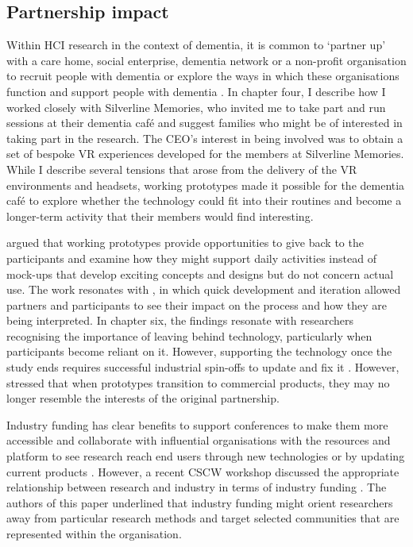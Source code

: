 \subsection{Partnership impact}
Within HCI research in the context of dementia, it is common to `partner up' with a care home, social enterprise, dementia network or a non-profit organisation to recruit people with dementia or explore the ways in which these organisations function and support people with dementia \citep{bartlett2019strategies}. In chapter four, I describe how I worked closely with Silverline Memories, who invited me to take part and run sessions at their dementia café and suggest families who might be of interested in taking part in the research. The CEO's interest in being involved was to obtain a set of bespoke VR experiences developed for the members at Silverline Memories. While I describe several tensions that arose from the delivery of the VR environments and headsets, working prototypes made it possible for the dementia café to explore whether the technology could fit into their routines and become a longer-term activity that their members would find interesting. 

\cite{bodker2018participatory} argued that working prototypes provide opportunities to give back to the participants and examine how they might support daily activities instead of mock-ups that develop exciting concepts and designs but do not concern actual use. The work resonates with \cite{lindsay_empathy_2012}, in which quick development and iteration allowed partners and participants to see their impact on the process and how they are being interpreted. In chapter six, the findings resonate with researchers recognising the importance of leaving behind technology, particularly when participants become reliant on it. However, supporting the technology once the study ends requires successful industrial spin-offs to update and fix it \citep{gitau2009fair}. However, \cite{chilana2015user} stressed that when prototypes transition to commercial products, they may no longer resemble the interests of the original partnership.

Industry funding has clear benefits to support conferences to make them more accessible and collaborate with influential organisations with the resources and platform to see research reach end users through new technologies or by updating current products \citep{grudin2017tool}. However, a recent CSCW workshop discussed the appropriate relationship between research and industry in terms of industry funding \citep{group_patron_2019}. The authors of this paper underlined that industry funding might orient researchers away from particular research methods and target selected communities that are represented within the organisation.

